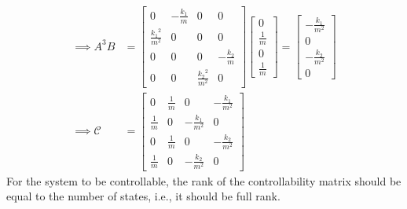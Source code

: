 \begin{align*}
    \\
    \implies
    A^{3}B
     & =
    \begin{bmatrix}
        0 & -\frac{k_{1}}{m} & 0 & 0 \\ \frac{{k_{1}}^2}{m^2} & 0 & 0 & 0\\ 0 & 0 & 0 & -\frac{k_{2}}{m}\\ 0 & 0 & \frac{{k_{2}}^2}{m^2} & 0
    \end{bmatrix}
    \begin{bmatrix}
        0           \\
        \frac{1}{m} \\
        0           \\
        \frac{1}{m}
    \end{bmatrix}
    =
    \begin{bmatrix}
        -\frac{k_1}{m^2} \\
        0                \\
        -\frac{k_2}{m^2} \\
        0
    \end{bmatrix}
    \\
    \implies
    \mathcal{C}
     & =
    \begin{bmatrix}
        0           & \frac{1}{m} & 0                  & -\frac{k_{1}}{m^2} \\
        \frac{1}{m} & 0           & -\frac{k_{1}}{m^2} & 0                  \\
        0           & \frac{1}{m} & 0                  & -\frac{k_{2}}{m^2} \\
        \frac{1}{m} & 0           & -\frac{k_{2}}{m^2} & 0
    \end{bmatrix}
\end{align*}
For the system to be controllable, the rank of the controllability matrix should be equal to the number of states, i.e., it should be full rank.

